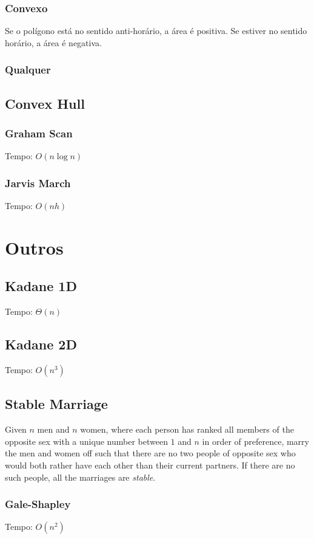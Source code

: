 \documentclass[12pt,a4paper]{article}
\begin{document}
			\subsubsection{Convexo}
				Se o polígono está no sentido anti-horário, a área é positiva. Se estiver no sentido horário, a área é negativa.
				
			\subsubsection{Qualquer}
				
		\subsection{Convex Hull}
			\subsubsection{Graham Scan}
				Tempo: \(O(n \log n)\)
				
			\subsubsection{Jarvis March}
				Tempo: \(O(n h)\)
				

	\section{Outros}
		\subsection{Kadane 1D}
			Tempo: \(\Theta(n)\)
			
		\subsection{Kadane 2D}
			Tempo: \(O(n^3)\)
			
		\subsection{Stable Marriage}
			Given $n$ men and $n$ women, where each person has ranked all members of the opposite sex with a unique number between $1$ and $n$ in order of preference, marry the men and women off such that there are no two people of opposite sex who would both rather have each other than their current partners. If there are no such people, all the marriages are \emph{stable}.
			\subsubsection{Gale-Shapley}
				Tempo: \(O(n^2)\)
				
\end{document}

